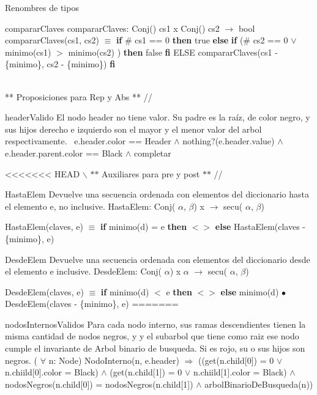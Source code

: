 \begin{DoxyParagraph}{\-Renombres de tipos}
\begin{DoxyParagraph}{comparar\+Claves}
comparar\+Claves\+: Conj() cs1 x Conj() cs2 $\to$ bool~\newline
 comparar\+Claves(cs1, cs2) $\equiv$ {\bfseries if} \# cs1 == 0 {\bfseries then} true {\bfseries else} {\bfseries if} (\# cs2 == 0 $\lor$ minimo(cs1) $>$ minimo(cs2) ) {\bfseries then} false {\bfseries fi} E\+L\+SE comparar\+Claves(cs1 -\/ \{minimo\}, cs2 -\/ \{minimo\}) {\bfseries fi} 
\end{DoxyParagraph}


\begin{DoxyVerb}\\ ** Proposiciones para Rep y Abs ** //
\end{DoxyVerb}


\begin{DoxyParagraph}{header\+Valido}
El nodo header no tiene valor. Su padre es la raíz, de color negro, y sus hijos derecho e izquierdo son el mayor y el menor valor del arbol respectivamente.~\newline
 e.\+header.\+color == Header $\land$ nothing?(e.\+header.\+value) $\land$ e.\+header.\+parent.\+color == Black $\land$ completar 
\end{DoxyParagraph}


<<<<<<< HEAD
$\backslash$ $\ast$$\ast$ \-Auxiliares para pre y post $\ast$$\ast$ // \begin{DoxyParagraph}{\-Hasta\-Elem}
\-Devuelve una secuencia ordenada con elementos del diccionario hasta el elemento e, no inclusive. \-Hasta\-Elem\-: \-Conj( $\alpha$, $\beta$) x $\to$ secu( $\alpha$, $\beta$)\par
 \-Hasta\-Elem(claves, e) $\equiv$ {\bfseries if} minimo(d) = e {\bfseries then} $<$$>$ {\bfseries else} \-Hasta\-Elem(claves -\/ \{minimo\}, e) 
\end{DoxyParagraph}
\begin{DoxyParagraph}{\-Desde\-Elem}
\-Devuelve una secuencia ordenada con elementos del diccionario desde el elemento e inclusive. \-Desde\-Elem\-: \-Conj( $\alpha$) x $\alpha$ $\to$ secu( $\alpha$, $\beta$)\par
 \-Desde\-Elem(claves, e) $\equiv$ {\bfseries if} minimo(d) $<$ e {\bfseries then} $<$$>$ {\bfseries else} minimo(d) $\bullet$ \-Desde\-Elem(claves -\/ \{minimo\}, e) 
=======
\begin{DoxyParagraph}{nodos\+Internos\+Validos}
Para cada nodo interno, sus ramas descendientes tienen la misma cantidad de nodos negros, y y el subarbol que tiene como raiz ese nodo cumple el invariante de Arbol binario de busqueda. Si es rojo, su o sus hijos son negros. ( $\forall$ n\+: Node) Nodo\+Interno(n, e.\+header) $\Rightarrow$ ((get(n.\+child\mbox{[}0\mbox{]}) = 0 $\lor$ n.\+chiild\mbox{[}0\mbox{]}.color = Black) $\land$ (get(n.\+child\mbox{[}1\mbox{]}) = 0 $\lor$ n.\+chiild\mbox{[}1\mbox{]}.color = Black) $\land$ nodos\+Negros(n.\+child\mbox{[}0\mbox{]}) = nodos\+Negros(n.\+child\mbox{[}1\mbox{]}) $\land$ arbol\+Binario\+De\+Busqueda(n)) 
\end{DoxyParagraph}



\end{DoxyParagraph}
\end{DoxyParagraph}
